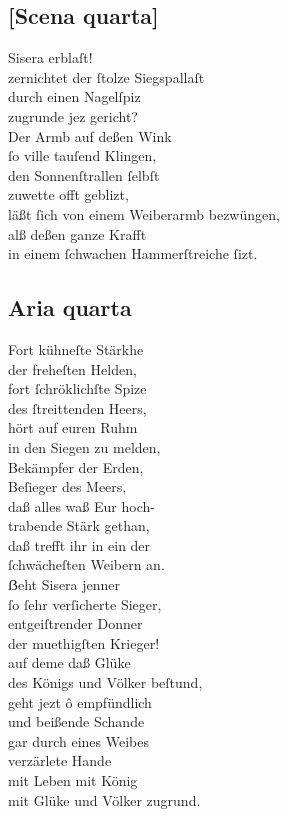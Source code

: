 \documentclass{ees}
\newenvironment{lyrics}[1]{%
  \subsection{#1}\nopagebreak%
  \begin{lyricslist}%
  \let\voice\item%
}{%
  \end{lyricslist}%
}
\begin{document}
\begin{lyrics}{[Scena quarta]}
  \voice[Barak]
  Sisera erblaſt!\\
  zernichtet der ſtolze Siegspallaſt\\
  durch einen Nagelſpiz\\
  zugrunde jez gericht?\\
  Der Armb auf deßen Wink\\
  ſo ville tauſend Klingen,\\
  den Sonnenſtrallen ſelbſt\\
  zuwette offt geblizt,\\
  läßt ſich von einem Weiberarmb bezwüngen,\\
  alß deßen ganze Krafft\\
  in einem ſchwachen Hammerſtreiche ſizt.
\end{lyrics}

\begin{lyrics}{Aria quarta}
  \voice[Barak]
  Fort kühneſte Stärkhe\\
  der freheſten Helden,\\
  fort ſchröklichſte Spize\\
  des ſtreittenden Heers,\\
  hört auf euren Ruhm\\
  in den Siegen zu melden,\\
  Bekämpfer der Erden,\\
  Beſieger des Meers,\\
  daß alles waß Eur hoch-\\
  trabende Stärk gethan,\\
  daß trefft ihr in ein der\\
  ſchwächeſten Weibern an.\\[1ex]
  ẞeht Sisera jenner\\
  ſo ſehr verſicherte Sieger,\\
  entgeiſtrender Donner\\
  der muethigſten Krieger!\\
  auf deme daß Glüke\\
  des Königs und Völker beſtund,\\
  geht jezt ô empfündlich\\
  und beißende Schande\\
  gar durch eines Weibes\\
  verzärlete Hande\\
  mit Leben mit König\\
  mit Glüke und Völker zugrund.
\end{lyrics}
\end{document}
